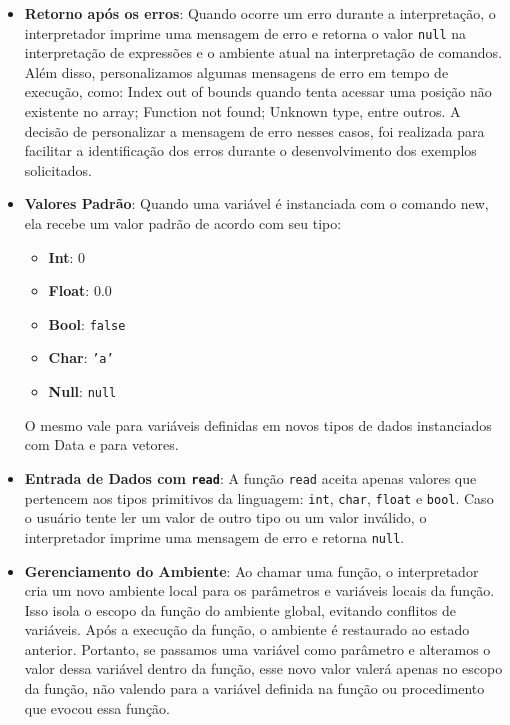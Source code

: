 \documentclass{article}
\begin{document}
\begin{itemize}
    \item \textbf{Retorno após os erros}: Quando ocorre um erro durante a interpretação, o interpretador imprime uma mensagem de erro e retorna o valor \texttt{null} na interpretação de expressões e o ambiente atual na interpretação de comandos. Além disso, personalizamos algumas mensagens de erro em tempo de execução, como: Index out of bounds quando tenta acessar uma posição não existente no array; Function not found; Unknown type, entre outros. A decisão de personalizar a mensagem de erro nesses casos, foi realizada para facilitar a identificação dos erros durante o desenvolvimento dos exemplos solicitados.
    
    \item \textbf{Valores Padrão}: Quando uma variável é instanciada com o comando new, ela recebe um valor padrão de acordo com seu tipo:
        \begin{itemize}
            \item \textbf{Int}: 0
            \item \textbf{Float}: 0.0
            \item \textbf{Bool}: \texttt{false}
            \item \textbf{Char}: \texttt{'a'}
            \item \textbf{Null}: \texttt{null}
        \end{itemize}
    O mesmo vale para variáveis definidas em novos tipos de dados instanciados com Data e para vetores.
    
    \item \textbf{Entrada de Dados com \texttt{read}}: A função \texttt{read} aceita apenas valores que pertencem aos tipos primitivos da linguagem: \texttt{int}, \texttt{char}, \texttt{float} e \texttt{bool}. Caso o usuário tente ler um valor de outro tipo ou um valor inválido, o interpretador imprime uma mensagem de erro e retorna \texttt{null}.

    \item \textbf{Gerenciamento do Ambiente}: Ao chamar uma função, o interpretador cria um novo ambiente local para os parâmetros e variáveis locais da função. Isso isola o escopo da função do ambiente global, evitando conflitos de variáveis. Após a execução da função, o ambiente é restaurado ao estado anterior. Portanto, se passamos uma variável como parâmetro e alteramos o valor dessa variável dentro da função, esse novo valor valerá apenas no escopo da função, não valendo para a variável definida na função ou procedimento que evocou essa função.
\end{itemize}
\end{document}
